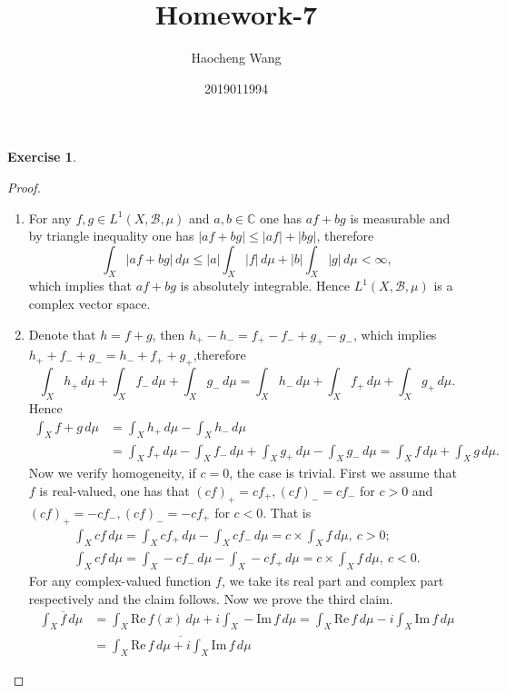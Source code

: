 \documentclass[a4paper]{article}
\title{Homework-7}
\author{Haocheng Wang \and 2019011994}
\newtheorem{ex}{Exercise}[subsection]
\renewcommand{\Re}{\mathrm{Re}\,}
\renewcommand{\Im}{\mathrm{Im}\,}
\begin{document}
\maketitle
\setcounter{ex}{39}\begin{ex}
\end{ex}\begin{proof}\ 
\begin{enumerate}[label = (\roman*)]
    \item For any $f, g \in L^1(X, \mathcal{B}, \mu)$ and $a, b \in \mathbb{C}$  one has $af + bg$ is measurable and
    by triangle inequality one has $|af + bg| \leq |af| + |bg|$, therefore $$
    \int_X |af + bg|\,d\mu \leq |a|\int_X |f|\,d\mu + |b|\int_X |g|\,d\mu < \infty,
    $$which implies that $af + bg$ is absolutely integrable. Hence $L^1(X, \mathcal{B}, \mu)$ is a complex vector space.
    \item Denote that $h = f + g$, then $h_+ - h_- = f_+ - f_- + g_+ - g_-$, which implies $h_+ + f_- + g_- = h_- 
    + f_+ + g_+$,therefore $$
    \int_{X} h_+\,d\mu + \int_{X} f_-\,d\mu + \int_{X} g_-\,d\mu = 
    \int_{X} h_-\,d\mu + \int_{X} f_+\,d\mu + \int_{X} g_+\,d\mu.
    $$
    Hence \begin{align*}
    \int_{X} f + g\,d\mu &= \int_{X} h_+\,d\mu - \int_{X} h_-\,d\mu \\
    &= \int_{X} f_+\,d\mu - \int_{X} f_-\,d\mu + \int_{X} g_+\,d\mu - \int_{X} g_-\,d\mu
    = \int_{X} f\,d\mu + \int_{X} g\,d\mu.
    \end{align*}
    Now we verify homogeneity, if $c = 0$, the case is trivial. First we assume that $f$ is real-valued,
    one has that $(cf)_+ = cf_+, (cf)_- = cf_-$ for $c > 0$
    and $(cf)_+ = -cf_-, (cf)_- = -cf_+$ for $c < 0$. That is \begin{gather*}
        \int_{X} cf\,d\mu = \int_{X} cf_+\,d\mu - 
        \int_{X} cf_-\,d\mu = c \times \int_{X} f\, d\mu,\ c > 0;\\
        \int_{X} cf\,d\mu = \int_{X} -cf_-\,d\mu - 
        \int_{X} -cf_+\,d\mu = c \times \int_{X} f\, d\mu,\ c < 0.
    \end{gather*}
    For any complex-valued function $f$, we take its real part and complex part respectively and the claim follows.
    Now we prove the third claim. \begin{align*}
        \int_{X} \overline{f}\, d\mu &= \int_{X} \Re  f(x)\, d\mu + i
        \int_{X} -\Im f \,d\mu = \int_{X} \Re  f\, d\mu - i
        \int_{X} \Im f \,d\mu\\
        &=\overline{\int_{X} \Re  f \,d\mu + i\int_{X} \Im f \,d\mu}

\end{align*}
\end{enumerate}
\end{proof}
\end{document}
